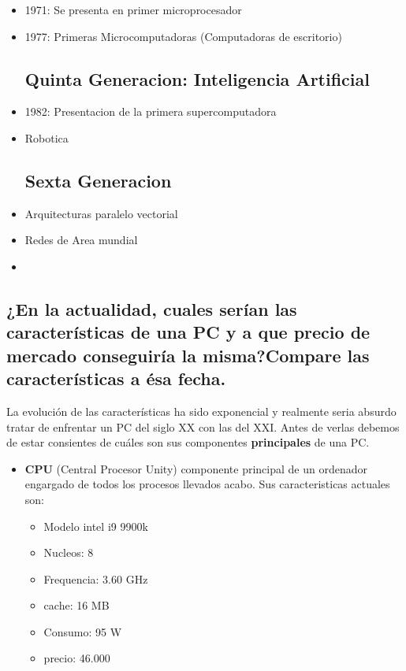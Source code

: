 \documentclass[11pt]{article}
\begin{document}
\begin{multicols}{2}
\begin{itemize}
\begin{itemize}
    \item 1971: Se presenta en primer microprocesador
      
    \item 1977: Primeras Microcomputadoras (Computadoras de escritorio)
    
    \subsection{Quinta Generacion: Inteligencia Artificial}
    \item 1982: Presentacion de la primera supercomputadora  
    
    \item Robotica
    
    \subsection{Sexta Generacion}

    \item Arquitecturas paralelo vectorial
      
    \item Redes de Area mundial
    \item 
  \end{itemize}
  
  
\subsection{¿En la actualidad, cuales serían las características de una PC y a que precio de mercado conseguiría la misma?Compare las características a ésa fecha.}

La evolución de las características ha sido exponencial y realmente seria absurdo tratar de enfrentar un PC del siglo XX con las del XXI. Antes de verlas debemos de estar consientes de cuáles son sus componentes \textbf{principales} de una PC. 
\begin{itemize}
  \item \textbf{CPU} (Central Procesor Unity)  componente principal de un ordenador engargado de todos los procesos llevados acabo. Sus caracteristicas actuales son:
  \begin{itemize}
    \item Modelo intel i9 9900k
    \item Nucleos: 8 
    \item Frequencia:  3.60 GHz
    \item cache:  16 MB
    \item Consumo: 95 W
    \item precio: 46.000 
  \end{itemize}


\end{itemize}
\end{itemize}
\end{multicols}
\end{document}
